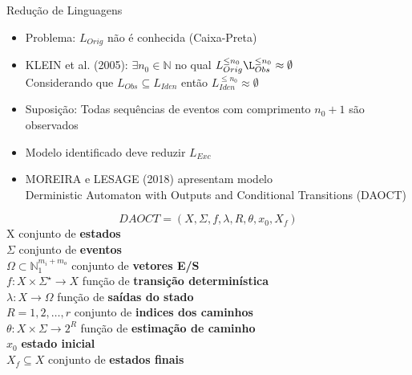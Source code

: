 \begin{frame}{Redução de Linguagens}
\begin{itemize}
\item Problema: $L_{Orig}$ não é conhecida \pause (Caixa-Preta) \pause
\item KLEIN et al. (2005):  $\exists n_0\in\mathbb{N}$ no qual
  $L_{Orig}^{\leq n_0}\L_{Obs}^{\leq n_0}\approx \emptyset $  \pause \\
Considerando que $L_{Obs}\subseteq L_{Iden}$ então  $L_{Iden}^{\leq n_0}\approx
\emptyset$  \pause
\item Suposição: Todas sequências de eventos com comprimento $n_0 + 1$ são observados  \pause
\item Modelo identificado deve reduzir $L_{Exc}$ \pause
  \item MOREIRA e LESAGE (2018) apresentam modelo \\Derministic Automaton with
    Outputs and Conditional Transitions (DAOCT) 
\end{itemize}
\end{frame}
\begin{frame}
\begin{definition}[DAOCT]
  \label{def:daoct}
  \small
  \[ DAOCT = (X,\Sigma,f,\lambda,R,\theta, x_0,X_f)\]
  \indent X conjunto de \textbf{estados} \\
  \indent $\Sigma$ conjunto de \textbf{eventos}\\
  \indent $\Omega \subset \mathbb{N}_1^{m_i+m_o} $ conjunto de \textbf{vetores E/S}\\
  \indent $f:  X \times \Sigma^\star \rightarrow X$ função de  \textbf{transição determinística}\\
  \indent $\lambda : X \rightarrow \Omega$ função de  \textbf{saídas do stado}\\
  \indent $R = {1,2,\dots,r}$ conjunto de \textbf{indices dos caminhos}\\
  \indent $\theta : X \times \Sigma \rightarrow 2^R$ função de \textbf{estimação
    de caminho}\\
  \indent $x_0$ \textbf{estado inicial} \\
  \indent $X_f \subseteq X $ conjunto de \textbf{estados finais}
\end{definition}
\end{frame}


